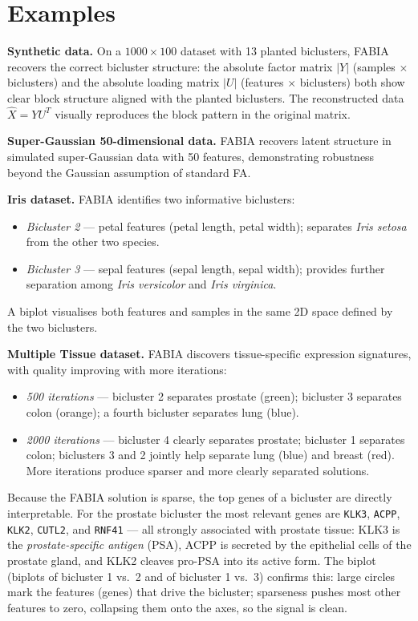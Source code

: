\documentclass[11pt, oneside]{book}
\begin{document}
\section{Examples}

\textbf{Synthetic data.}
On a $1000 \times 100$ dataset with 13 planted biclusters, FABIA recovers the correct
bicluster structure: the absolute factor matrix $|Y|$ (samples $\times$ biclusters) and
the absolute loading matrix $|U|$ (features $\times$ biclusters) both show clear
block structure aligned with the planted biclusters.
The reconstructed data $\hat{X} = YU^T$ visually reproduces the block pattern in the original matrix.

\textbf{Super-Gaussian 50-dimensional data.}
FABIA recovers latent structure in simulated super-Gaussian data with 50 features,
demonstrating robustness beyond the Gaussian assumption of standard FA.

\textbf{Iris dataset.}
FABIA identifies two informative biclusters:
\begin{itemize}
  \item \emph{Bicluster 2} — petal features (petal length, petal width); separates \emph{Iris setosa}
        from the other two species.
  \item \emph{Bicluster 3} — sepal features (sepal length, sepal width); provides further separation
        among \emph{Iris versicolor} and \emph{Iris virginica}.
\end{itemize}
A biplot visualises both features and samples in the same 2D space defined by the two biclusters.

\textbf{Multiple Tissue dataset.}
FABIA discovers tissue-specific expression signatures, with quality improving with more iterations:
\begin{itemize}
  \item \emph{500 iterations} — bicluster 2 separates prostate (green); bicluster 3 separates colon
        (orange); a fourth bicluster separates lung (blue).
  \item \emph{2000 iterations} — bicluster 4 clearly separates prostate; bicluster 1 separates colon;
        biclusters 3 and 2 jointly help separate lung (blue) and breast (red).
        More iterations produce sparser and more clearly separated solutions.
\end{itemize}
Because the FABIA solution is sparse, the top genes of a bicluster are directly interpretable.
For the prostate bicluster the most relevant genes are \texttt{KLK3}, \texttt{ACPP},
\texttt{KLK2}, \texttt{CUTL2}, and \texttt{RNF41} — all strongly associated with
prostate tissue: KLK3 is the \emph{prostate-specific antigen} (PSA), ACPP is secreted
by the epithelial cells of the prostate gland, and KLK2 cleaves pro-PSA into its active form.
The biplot (biplots of bicluster 1 vs.\ 2 and of bicluster 1 vs.\ 3) confirms this:
large circles mark the features (genes) that drive the bicluster; sparseness pushes most
other features to zero, collapsing them onto the axes, so the signal is clean.
\end{document}

